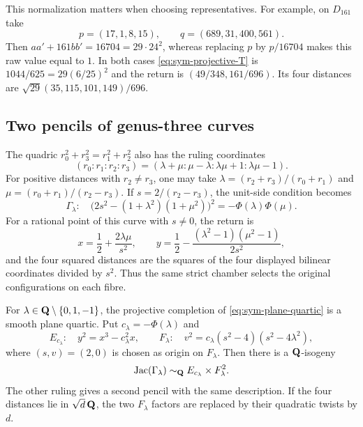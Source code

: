 This normalization matters when choosing representatives.  For example,
on $D_{161}$ take
\[
 p=(17,1,8,15),\qquad q=(689,31,400,561).
\]
Then $aa'+161bb'=16704=29\cdot24^2$, whereas replacing $p$ by
$p/16704$ makes this raw value equal to $1$.  In both cases
\eqref{eq:sym-projective-T} is $1044/625=29(6/25)^2$ and
the return is $(49/348,161/696)$.  Its four distances are
$\sqrt{29}(35,115,101,149)/696$.

\subsection{Two pencils of genus-three curves}

The quadric $r_0^2+r_3^2=r_1^2+r_2^2$ also has the ruling
coordinates
\[
 (r_0:r_1:r_2:r_3)
 =(\lambda+\mu:\mu-\lambda:\lambda\mu+1:\lambda\mu-1).
\]
For positive distances with $r_2\ne r_3$, one may take
$\lambda=(r_2+r_3)/(r_0+r_1)$ and
$\mu=(r_0+r_1)/(r_2-r_3)$.  If $s=2/(r_2-r_3)$, the unit-side
condition becomes
\begin{equation}
 \Gamma_\lambda:\quad
 \bigl(2s^2-(1+\lambda^2)(1+\mu^2)\bigr)^2
 =-\Phi(\lambda)\Phi(\mu).
 \label{eq:sym-plane-quartic}
\end{equation}
For a rational point of this curve with $s\ne0$, the return is
\[
 x=\frac12+\frac{2\lambda\mu}{s^2},\qquad
 y=\frac12-\frac{(\lambda^2-1)(\mu^2-1)}{2s^2},
\]
and the four squared distances are the squares of the four displayed
bilinear coordinates divided by $s^2$.  Thus the same strict chamber
selects the original configurations on each fibre.

\begin{theorem}
\label{thm:sym-quartic-pencil}
For $\lambda\in\mathbf Q\setminus\{0,1,-1\}$, the projective
completion of \eqref{eq:sym-plane-quartic} is a smooth plane
quartic.  Put $c_\lambda=-\Phi(\lambda)$ and
\[
 E_{c_\lambda}:\quad y^2=x^3-c_\lambda^2x,
 \qquad
 F_\lambda:\quad v^2=c_\lambda(s^2-4)(s^2-4\lambda^2),
\]
where $(s,v)=(2,0)$ is chosen as origin on $F_\lambda$.
Then there is a $\mathbf Q$-isogeny
\[
 \operatorname{Jac}(\Gamma_\lambda)\sim_\mathbf Q
 E_{c_\lambda}\times F_\lambda^2.
\]
The other ruling gives a second pencil with the same description.
If the four distances lie in $\sqrt d\,\mathbf Q$, the two
$F_\lambda$ factors are replaced by their quadratic twists by $d$.
\end{theorem}

